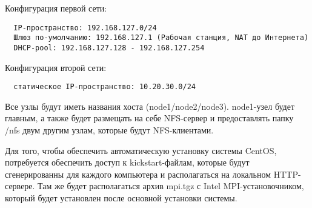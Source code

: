 Конфигурация первой сети:
\begin{verbatim}
  IP-пространство: 192.168.127.0/24
  Шлюз по-умолчанию: 192.168.127.1 (Рабочая станция, NAT до Интернета)
  DHCP-pool: 192.168.127.128 - 192.168.127.254
\end{verbatim}

Конфигурация второй сети:
\begin{verbatim}
  статическое IP-пространство: 10.20.30.0/24
\end{verbatim}

\clearpage

Все узлы будут иметь названия хоста (node1/node2/node3). node1-узел
будет главным, а также будет размещать на себе NFS-сервер и предоставлять
папку /nfs двум другим узлам, которые будут NFS-клиентами.

Для того, чтобы обеспечить автоматическую установку системы
\textmd{CentOS}, потребуется обеспечить доступ к kickstart-файлам, которые
будут сгенерированны для каждого компьютера и располагаться на локальном
HTTP-сервере. Там же будет располагаться архив mpi.tgz с Intel MPI-установочником,
который будет установлен после основной установки системы.
